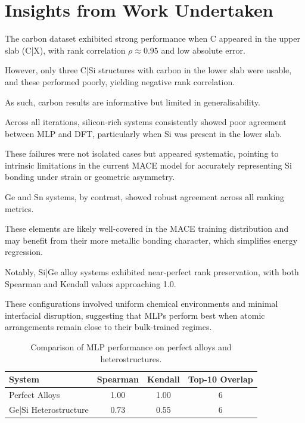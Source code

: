 \section{Insights from Work Undertaken} \label{section:insights_from_work}


The carbon dataset exhibited strong performance when C appeared in the upper slab (C|X), with rank correlation
$\rho \approx 0.95$ and low absolute error.

However, only three C|Si structures with carbon in the lower slab were usable, and these performed poorly, yielding
negative rank correlation.

As such, carbon results are informative but limited in generalisability.


Across all iterations, silicon-rich systems consistently showed poor agreement between MLP and DFT, particularly when Si
was present in the lower slab.

These failures were not isolated cases but appeared systematic, pointing to intrinsic limitations in the current MACE
model for accurately representing Si bonding under strain or geometric asymmetry.


Ge and Sn systems, by contrast, showed robust agreement across all ranking metrics.

These elements are likely well-covered in the MACE training distribution and may benefit from their more metallic
bonding character, which simplifies energy regression.


Notably, Si|Ge alloy systems exhibited near-perfect rank preservation, with both Spearman and Kendall values approaching
1.0.

These configurations involved uniform chemical environments and minimal interfacial disruption, suggesting that MLPs
perform best when atomic arrangements remain close to their bulk-trained regimes.


\begin{table}[h]
    \centering
    \caption{Comparison of MLP performance on perfect alloys and heterostructures.}
    \begin{tabular}{lccc}
        System & Spearman & Kendall & Top-10 Overlap \\
        \hline
        Perfect Alloys & 1.00 & 1.00 & 6 \\
        Ge|Si Heterostructure & 0.73 & 0.55 & 6 \\
    \end{tabular}
\end{table}

